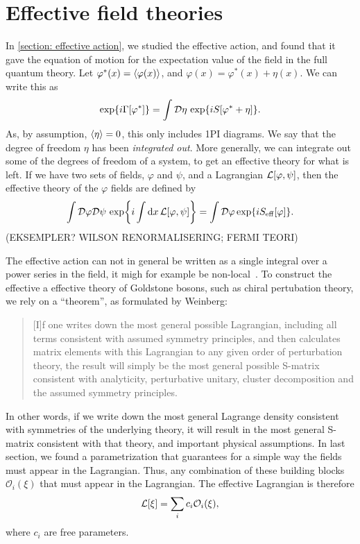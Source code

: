 \section{Effective field theories}
In \autoref{section: effective action}, we studied the effective action, and found that it gave the equation of motion for the expectation value of the field in the full quantum theory.
Let $\varphi^*(x) = \ex{\varphi(x)}$, and $\varphi(x) = \varphi^*(x) + \eta(x)$.
We can write this as
\begin{equation}
    \exp{i \Gamma[\varphi^*]} = \int \mathcal{D} \eta \, \exp{i S[\varphi^* + \eta]}.
\end{equation}
As, by assumption, $\ex{\eta} = 0$, this only includes 1PI diagrams.
We say that the degree of freedom $\eta$ has been \emph{integrated out}.
More generally, we can integrate out some of the degrees of freedom of a system, to get an effective theory for what is left.
If we have two sets of fields, $\varphi$ and $\psi$, and a Lagrangian $\mathcal{L}[\varphi, \psi]$, then the effective theory of the $\varphi$ fields are defined by
\begin{equation}
    \int \mathcal{D}\varphi \mathcal{D} \psi \, \exp{i\int \dd x\, \mathcal{L}[\varphi, \psi]}
    = \int \mathcal{D} \varphi \exp{i S_\mathrm{eff}[\varphi]}.
\end{equation}
(EKSEMPLER? WILSON RENORMALISERING; FERMI TEORI)

The effective action can not in general be written as a single integral over a power series in the field, it migh for example be non-local~\cite{Schwartz:QFT}.
To construct the effective a effective theory of Goldstone bosons, such as chiral pertubation theory, we rely on a ``theorem'', as formulated by Weinberg:
\begin{quote}
    [I]f one writes down the most general possible Lagrangian, including all terms consistent with assumed symmetry principles, and then calculates matrix elements with this Lagrangian to any given order of perturbation theory, the result will simply be the most general possible S-matrix consistent with analyticity, perturbative unitary, cluster decomposition and the assumed symmetry principles. \cite{WeinbergPhenom}
\end{quote}
In other words, if we write down the most general Lagrange density consistent with symmetries of the underlying theory, it will result in the most general S-matrix consistent with that theory, and important physical assumptions.
In last section, we found a parametrization that guarantees for a simple way the fields must appear in the Lagrangian.
Thus, any combination of these building blocks $\mathcal{O}_i(\xi)$ that must appear in the Lagrangian.
The effective Lagrangian is therefore
\begin{equation}
    \mathcal{L}[\xi] = \sum_i c_i \mathcal{O}_i(\xi),
\end{equation}
where $c_i$ are free parameters.

